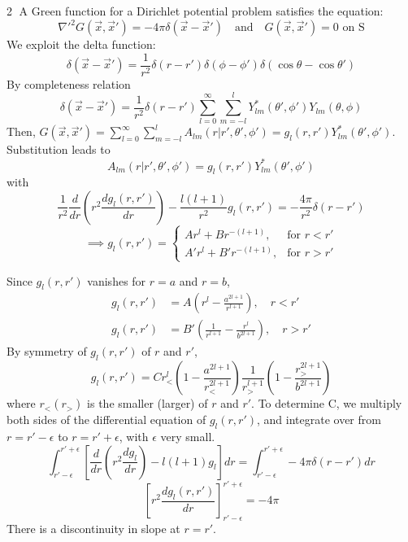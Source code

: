 \documentclass{article}
\begin{document}
	\textcircled{2} A Green function for a Dirichlet potential problem satisfies the equation:
	\begin{equation*}
		\nabla'^2 G(\vec{x}, \vec{x}') = -4\pi \delta(\vec{x}-\vec{x}') \quad \text{and} \quad G(\vec{x}, \vec{x}')=0 \text{ on S}
	\end{equation*}
	We exploit the delta function:
	\begin{equation*}
		\delta(\vec{x}-\vec{x}') = \frac{1}{r^2} \delta(r-r') \delta(\phi-\phi') \delta(\cos\theta - \cos\theta')
	\end{equation*}
	By completeness relation
	\begin{equation*}
		\delta(\vec{x}-\vec{x}') = \frac{1}{r^2} \delta(r-r') \sum_{l=0}^\infty \sum_{m=-l}^l Y_{lm}^*(\theta', \phi') Y_{lm}(\theta, \phi)
	\end{equation*}
	Then, $G(\vec{x}, \vec{x}') = \sum_{l=0}^\infty \sum_{m=-l}^l A_{lm}(r|r', \theta', \phi') = g_l(r, r') Y_{lm}^*(\theta', \phi')$.
	Substitution leads to
	\begin{equation*}
		A_{lm}(r|r', \theta', \phi') = g_l(r,r') Y_{lm}^*(\theta', \phi')
	\end{equation*}
	with
	\begin{equation*}
		\frac{1}{r^2} \frac{d}{dr} \left(r^2 \frac{d g_l(r,r')}{dr} \right) - \frac{l(l+1)}{r^2} g_l(r,r') = -\frac{4\pi}{r^2} \delta(r-r')
	\end{equation*}
	\begin{equation*}
		\implies g_l(r, r') =
		\begin{cases}
			A r^l + B r^{-(l+1)}, & \text{for } r < r' \\
			A' r^l + B' r^{-(l+1)}, & \text{for } r > r'
		\end{cases}
	\end{equation*}
	
	Since $g_l(r,r')$ vanishes for $r=a$ and $r=b$,
	\begin{align*}
		g_l(r,r') &= A \left( r^l - \frac{a^{2l+1}}{r^{l+1}} \right), \quad r<r' \\
		g_l(r,r') &= B' \left( \frac{1}{r^{l+1}} - \frac{r^l}{b^{2l+1}} \right), \quad r>r'
	\end{align*}
	By symmetry of $g_l(r,r')$ of $r$ and $r'$,
	\begin{equation*}
		g_l(r,r') = C r_<^l \left( 1 - \frac{a^{2l+1}}{r_<^ {2l+1}} \right) \frac{1}{r_>^{l+1}} \left( 1 - \frac{r_>^ {2l+1}}{b^{2l+1}} \right)
	\end{equation*}
	where $r_< (r_>)$ is the smaller (larger) of $r$ and $r'$.
	To determine C, we multiply both sides of the differential equation of $g_l(r,r')$, and integrate over from $r=r'-\epsilon$ to $r=r'+\epsilon$, with $\epsilon$ very small.
	\begin{equation*}
		\int_{r'-\epsilon}^{r'+\epsilon} \left[ \frac{d}{dr} \left(r^2 \frac{dg_l}{dr}\right) - l(l+1)g_l \right] dr = \int_{r'-\epsilon}^{r'+\epsilon} -4\pi \delta(r-r') dr
	\end{equation*}
	\begin{equation*}
		\left[ r^2 \frac{dg_l(r,r')}{dr} \right]_{r'-\epsilon}^{r'+\epsilon} = -4\pi
	\end{equation*}
	There is a discontinuity in slope at $r=r'$.
	
\end{document}
